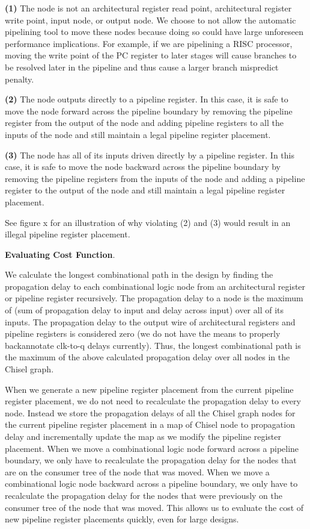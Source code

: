 {\bf (1)} 
The node is not an architectural register read point, architectural register write point, input node, or output node. We choose to not allow the automatic pipelining tool to move these nodes because doing so could have large unforeseen performance implications. For example, if we are pipelining a RISC processor, moving the write point of the PC register to later stages will cause branches to be resolved later in the pipeline and thus cause a larger branch mispredict penalty.

{\bf (2)}  
The node outputs directly to a pipeline register. In this case, it is safe to move the node forward across the pipeline boundary by removing the pipeline register from the output of the node and adding pipeline registers to all the inputs of the node and still maintain a legal pipeline register placement. 

{\bf (3)} 
The node has all of its inputs driven directly by a pipeline register. In this case, it is safe to move the node backward across the pipeline boundary by removing the pipeline registers from the inputs of the node and adding a pipeline register to the output of the node and still maintain a legal pipeline register placement.

See figure x for an illustration of why violating (2) and (3) would result in an illegal pipeline register placement.

{\bf Evaluating Cost Function}.

We calculate the longest combinational path in the design by finding the propagation delay to each combinational logic node from an architectural register or pipeline register recursively. The propagation delay to a node is the maximum of (sum of propagation delay to input and delay across input) over all of its inputs. The propagation delay to the output wire of architectural registers and pipeline registers is considered zero (we do not have the means to properly backannotate clk-to-q delays currently).  Thus, the longest combinational path is the maximum of the above calculated propagation delay over all nodes in the Chisel graph.

When we generate a new pipeline register placement from the current pipeline register placement, we do not need to recalculate the propagation delay to every node. Instead we store the propagation delays of all the Chisel graph nodes for the current pipeline register placement in a map of Chisel node to propagation delay and incrementally update the map as we modify the pipeline register placement. When we move a combinational logic node forward across a pipeline boundary, we only have to recalculate the propagation delay for the nodes that are on the consumer tree of the node that was moved. When we move a combinational logic node backward across a pipeline boundary, we only have to recalculate the propagation delay for the nodes that were previously on the consumer tree of the node that was moved. This allows us to evaluate the cost of new pipeline register placements quickly, even for large designs.


